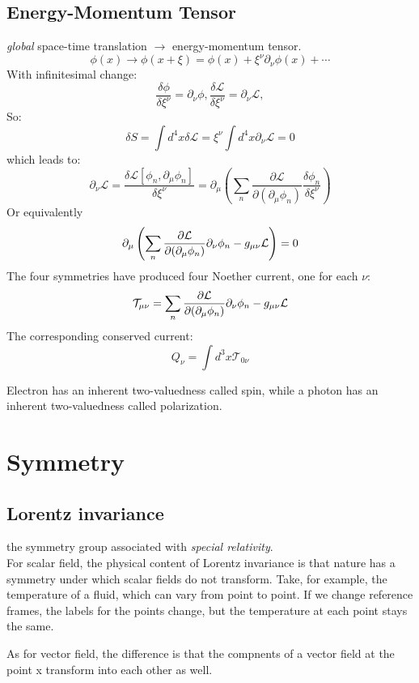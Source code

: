 \subsection{Energy-Momentum Tensor}
\textit{global} space-time translation $\rightarrow$ energy-momentum tensor.  \\
\[ \phi(x) \rightarrow \phi(x+\xi) = \phi(x) + \xi^\nu\partial_\nu\phi(x) + \cdots \]
With infinitesimal change:
\[ \frac{\delta\phi}{\delta\xi^\nu} = \partial_\nu\phi, 
\frac{\delta\mathcal{L}}{\delta\xi^\nu} = \partial_\nu\mathcal{L}, 
\]
So:
\[ \delta S = \int d^4x\delta\mathcal{L} = \xi^\nu\int
d^4x\partial_\nu\mathcal{L} = 0 \]
which leads to:
\[ \partial_\nu\mathcal{L} =
\frac{\delta\mathcal{L}[\phi_n,\partial_\mu\phi_n]}{\delta\xi^\nu} = 
\partial_\mu\left(
\displaystyle\sum_n\frac{\partial\mathcal{L}}{\partial(\partial_\mu\phi_n)}\frac{\delta\phi_n}{\delta\xi^\nu}
\right)
    \]
Or equivalently
\[
\partial_\mu\left(
\displaystyle\sum_n\frac{\partial\mathcal{L}}{\partial(\partial_\mu\phi_n)}\partial_\nu\phi_n
- g_{\mu\nu}\mathcal{L}
\right) = 0
    \]
The four symmetries have produced four Noether current, one for each $\nu$:
\begin{equation}
    \mathcal{T}_{\mu\nu} = 
    \displaystyle\sum_n\frac{\partial\mathcal{L}}{\partial(\partial_\mu\phi_n)}\partial_\nu\phi_n
    - g_{\mu\nu}\mathcal{L}
\end{equation}
The corresponding conserved current:
\[
    Q_\nu = \int d^3x\mathcal{T}_{0\nu} \]


Electron has an inherent two-valuedness called spin, while a photon has
an inherent two-valuedness called polarization.


\section{Symmetry}
\subsection{Lorentz invariance} the symmetry group associated with
\emph{special relativity}. \\
For scalar field, the physical content of Lorentz invariance is 
that nature has a symmetry under which scalar fields do not transform. 
Take, for example, the temperature of a fluid, which can vary from 
point to point. If we change reference frames, the labels for the 
points change, but the temperature at each point stays the same.

As for vector field, the difference is that the compnents of a vector field
at the point x transform into each other as well.

